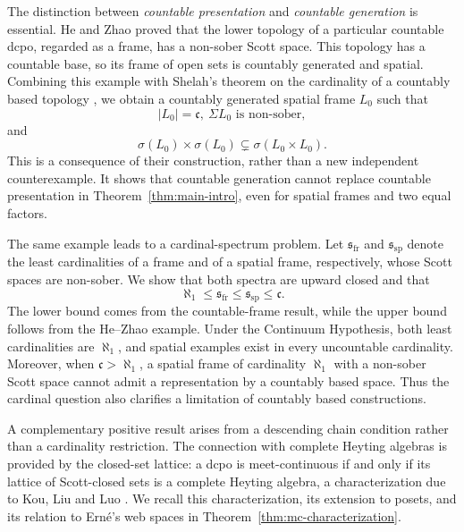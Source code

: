 \documentclass[11pt,reqno]{amsart}
\theoremstyle{definition}
\numberwithin{equation}{section}
\newcommand{\ssp}{\mathfrak{s}_{\mathrm{sp}}}
\newcommand{\sfr}{\mathfrak{s}_{\mathrm{fr}}}
\newcommand{\cc}{\mathfrak{c}}
\begin{document}
The distinction between \emph{countable presentation} and \emph{countable
generation} is essential. He and Zhao \citep[Proposition~4.11]{HeZhao2026}
proved that the lower topology of a particular countable dcpo, regarded
as a frame, has a non-sober Scott space. This topology has a countable
base, so its frame of open sets is countably generated and spatial.
Combining this example with Shelah's theorem on the cardinality of a
countably based topology \citep{Shelah1993}, we obtain a countably
generated spatial frame $L_0$ such that
\[
  |L_0|=\cc,~ \Sigma L_0\text{ is non-sober},
\]
and
\[
  \sigma(L_0)\times\sigma(L_0)
  \subsetneq\sigma(L_0\times L_0).
\]
This is a consequence of their construction, rather than a new independent
counterexample. It shows that countable generation cannot replace
countable presentation in Theorem~\ref{thm:main-intro}, even for spatial
frames and two equal factors.

The same example leads to a cardinal-spectrum problem. Let $\sfr$ and
$\ssp$ denote the least cardinalities of a frame and of a spatial frame,
respectively, whose Scott spaces are non-sober. We show that both spectra
are upward closed and that
\begin{equation}\label{eq:intro-bounds}
  \aleph_1\leq\sfr\leq\ssp\leq\cc.
\end{equation}
The lower bound comes from the countable-frame result, while the upper
bound follows from the He--Zhao example. Under the Continuum Hypothesis,
both least cardinalities are $\aleph_1$, and spatial examples exist in
every uncountable cardinality. Moreover, when $\cc>\aleph_1$, a spatial
frame of cardinality $\aleph_1$ with a non-sober Scott space cannot admit
a representation by a countably based space. Thus the cardinal question
also clarifies a limitation of countably based constructions.

A complementary positive result arises from a descending chain condition
rather than a cardinality restriction. The connection with complete Heyting
algebras is provided by the closed-set lattice: a dcpo is meet-continuous
if and only if its lattice of Scott-closed sets is a complete Heyting
algebra, a characterization due to Kou, Liu and Luo
\citep{KouLiuLuo2003}. We recall this characterization, its extension to
posets, and its relation to Ern\'e's web spaces in
Theorem~\ref{thm:mc-characterization}.
\end{document}
